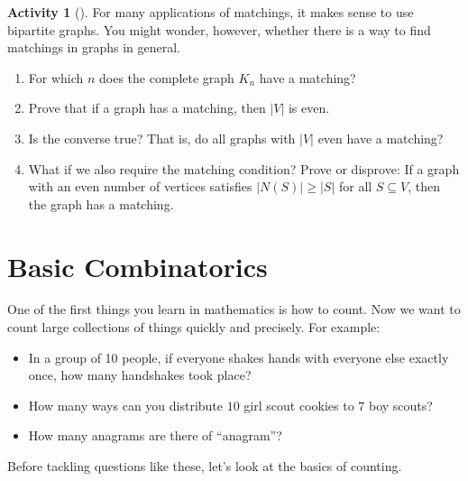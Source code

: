 \documentclass[10pt,]{book}
\theoremstyle{plain}
\theoremstyle{definition}
\theoremstyle{definition}
\theoremstyle{definition}
\newtheorem{activity}[project]{Activity}
\numberwithin{equation}{chapter}
\newcommand{\card}[1]{\left| #1 \right|}
\begin{document}
\begin{activity}[]\label{activity-55}
\hypertarget{p-465}{}%
For many applications of matchings, it makes sense to use bipartite graphs. You might wonder, however, whether there is a way to find matchings in graphs in general.%
\begin{enumerate}[font=\bfseries,label=(\alph*),ref=\alph*]
\item\label{task-68} \hypertarget{p-466}{}%
For which \(n\) does the complete graph \(K_n\) have a matching?%
\item\label{task-69} \hypertarget{p-467}{}%
Prove that if a graph has a matching, then \(\card{V}\) is even.%
\item\label{task-70} \hypertarget{p-468}{}%
Is the converse true?  That is, do all graphs with \(\card{V}\) even have a matching?%
\item\label{task-71} \hypertarget{p-469}{}%
What if we also require the matching condition?  Prove or disprove: If a graph with an even number of vertices satisfies \(\card{N(S)} \ge \card{S}\) for all \(S \subseteq V\), then the graph has a matching.%
\end{enumerate}
\end{activity}
\typeout{************************************************}
\typeout{************************************************}
\chapter[{Basic Combinatorics}]{Basic Combinatorics}\label{ch_basic-combinatorics}
\hypertarget{p-470}{}%
One of the first things you learn in mathematics is how to count. Now we want to count large collections of things quickly and precisely. For example: \leavevmode%
\begin{itemize}[label=\textbullet]
\item{}\hypertarget{p-471}{}%
In a group of 10 people, if everyone shakes hands with everyone else exactly once, how many handshakes took place?%
\item{}\hypertarget{p-472}{}%
How many ways can you distribute \(10\) girl scout cookies to \(7\) boy scouts?%
\item{}\hypertarget{p-473}{}%
How many anagrams are there of ``anagram''?%
\end{itemize}
%
\par
\hypertarget{p-474}{}%
Before tackling questions like these, let's look at the basics of counting.%
\typeout{************************************************}
\typeout{************************************************}
\end{document}
